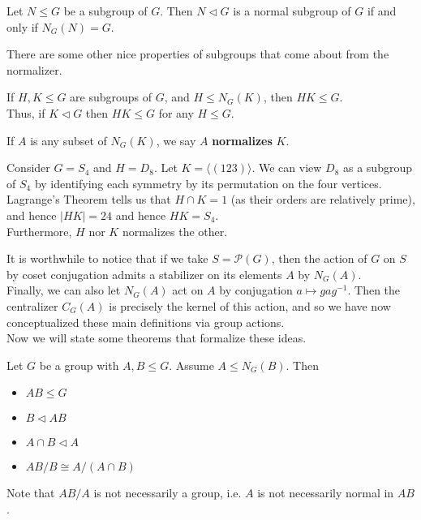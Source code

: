\documentclass{memoir}
\begin{document}
\begin{prop}
	Let \(N\leq G\) be a subgroup of \(G\). Then \(N \triangleleft G\) is a normal subgroup of \(G\) if and only if \(N_G(N) = G\).
\end{prop}

There are some other nice properties of subgroups that come about from the normalizer.

\begin{prop}
	If \(H,K \leq G\) are subgroups of \(G\), and \(H\leq N_G(K)\), then \(HK \leq G\).\\

	Thus, if \(K \triangleleft G\) then \(HK \leq G\) for any \(H\leq G\).
\end{prop}

\begin{defn}
	If \(A\) is any subset of \(N_G(K)\), we say \(A\) \textbf{normalizes} \(K\).
\end{defn}

\begin{exmp}
	Consider \(G = S_4\) and \(H = D_8\). Let \(K = \langle (123) \rangle \). We can view \(D_8\) as a subgroup of \(S_4\) by identifying each symmetry by its permutation on the four vertices. Lagrange's Theorem tells us that \(H\cap K = 1\) (as their orders are relatively prime), and hence \(\left| HK \right| =24\) and hence \(HK = S_4\).\\

	Furthermore, \(H\) nor \(K\) normalizes the other.
\end{exmp}
It is worthwhile to notice that if we take \(S = \mathcal{P}(G)\), then the action of \(G\) on \(S\) by coset conjugation admits a stabilizer on its elements \(A\) by \(N_G(A)\).\\

Finally, we can also let \(N_G(A)\) act on \(A\) by conjugation \(a\mapsto gag^{-1}\). Then the centralizer \(C_G(A)\) is precisely the kernel of this action, and so we have now conceptualized these main definitions via group actions.\\

Now we will state some theorems that formalize these ideas.

\begin{thm}
	Let \(G\) be a group with \(A,B \leq G\). Assume \(A \leq N_G(B)\). Then
\begin{itemize}
	\item \(AB \leq G\) 
	\item \(B \triangleleft AB\) 
	\item \(A\cap B \triangleleft A\) 
	\item \(AB / B \cong A / (A\cap B)\)
\end{itemize}
\end{thm}
Note that \(AB / A\) is not necessarily a group, i.e. \(A\) is not necessarily normal in \(AB\).
\end{document}
